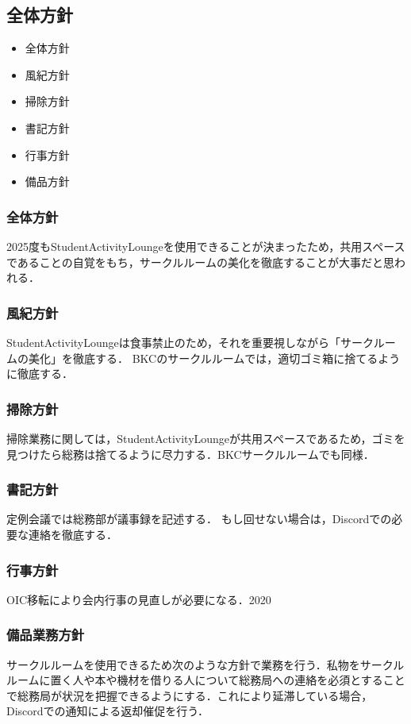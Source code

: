 \subsection*{全体方針}


\begin{itemize}
	\item 全体方針
	\item 風紀方針
	\item 掃除方針
	\item 書記方針
	\item 行事方針
	\item 備品方針
\end{itemize}

\subsubsection*{全体方針}
2025度もStudentActivityLoungeを使用できることが決まったため，共用スペースであることの自覚をもち，サークルルームの美化を徹底することが大事だと思われる．

\subsubsection*{風紀方針}
StudentActivityLoungeは食事禁止のため，それを重要視しながら「サークルームの美化」を徹底する．
BKCのサークルルームでは，適切ゴミ箱に捨てるように徹底する．

\subsubsection*{掃除方針}
掃除業務に関しては，StudentActivityLoungeが共用スペースであるため，ゴミを見つけたら総務は捨てるように尽力する．BKCサークルルームでも同様．

\subsubsection*{書記方針}
定例会議では総務部が議事録を記述する．
もし回せない場合は，Discordでの必要な連絡を徹底する．

\subsubsection*{行事方針}
OIC移転により会内行事の見直しが必要になる．2020

\subsubsection*{備品業務方針}
サークルルームを使用できるため次のような方針で業務を行う．私物をサークルルームに置く人や本や機材を借りる人について総務局への連絡を必須とすることで総務局が状況を把握できるようにする．これにより延滞している場合，Discordでの通知による返却催促を行う．

